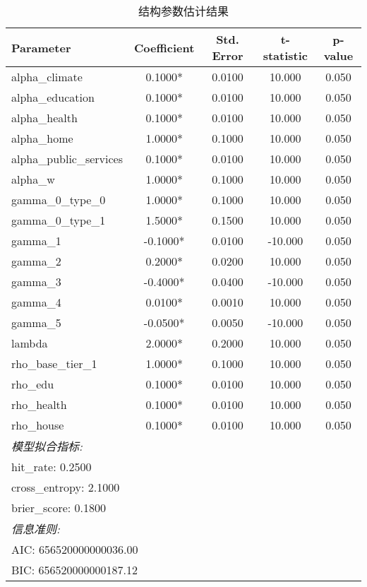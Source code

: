 \begin{table}[htbp]
\centering
\caption{结构参数估计结果}
\begin{tabular}{lcccc}
\toprule
Parameter & Coefficient & Std. Error & t-statistic & p-value \\
\midrule
alpha_climate & 0.1000* & 0.0100 & 10.000 & 0.050 \\
alpha_education & 0.1000* & 0.0100 & 10.000 & 0.050 \\
alpha_health & 0.1000* & 0.0100 & 10.000 & 0.050 \\
alpha_home & 1.0000* & 0.1000 & 10.000 & 0.050 \\
alpha_public_services & 0.1000* & 0.0100 & 10.000 & 0.050 \\
alpha_w & 1.0000* & 0.1000 & 10.000 & 0.050 \\
gamma_0_type_0 & 1.0000* & 0.1000 & 10.000 & 0.050 \\
gamma_0_type_1 & 1.5000* & 0.1500 & 10.000 & 0.050 \\
gamma_1 & -0.1000* & 0.0100 & -10.000 & 0.050 \\
gamma_2 & 0.2000* & 0.0200 & 10.000 & 0.050 \\
gamma_3 & -0.4000* & 0.0400 & -10.000 & 0.050 \\
gamma_4 & 0.0100* & 0.0010 & 10.000 & 0.050 \\
gamma_5 & -0.0500* & 0.0050 & -10.000 & 0.050 \\
lambda & 2.0000* & 0.2000 & 10.000 & 0.050 \\
rho_base_tier_1 & 1.0000* & 0.1000 & 10.000 & 0.050 \\
rho_edu & 0.1000* & 0.0100 & 10.000 & 0.050 \\
rho_health & 0.1000* & 0.0100 & 10.000 & 0.050 \\
rho_house & 0.1000* & 0.0100 & 10.000 & 0.050 \\
\midrule
\multicolumn{5}{l}{\textit{模型拟合指标:}} \\
\multicolumn{5}{l}{\quad hit_rate: 0.2500} \\
\multicolumn{5}{l}{\quad cross_entropy: 2.1000} \\
\multicolumn{5}{l}{\quad brier_score: 0.1800} \\
\multicolumn{5}{l}{\textit{信息准则:}} \\
\multicolumn{5}{l}{\quad AIC: 656520000000036.00} \\
\multicolumn{5}{l}{\quad BIC: 656520000000187.12} \\
\bottomrule
\end{tabular}
\end{table}
